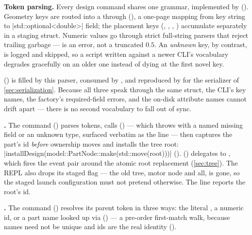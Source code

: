 \textbf{Token parsing.} Every design command shares one  grammar, implemented by
 (). Geometry keys are routed into a
 through  (), a one-page mapping from
key string to \cppinline|std::optional<double>| field; the placement keys (,
, , ) accumulate separately in a 
staging struct. Numeric values go through strict full-string parsers that reject trailing garbage
---  is an error, not a truncated $0.5$. An \emph{unknown} key, by contrast, is
logged and skipped, so a script written against a newer CLI's vocabulary degrades gracefully on an
older one instead of dying at the first novel key.

\begin{designrule}
 () is filled by this parser, consumed by
, and reproduced by  for the serializer of \cref{sec:serialization}.
Because all three speak through the same struct, the CLI's key names, the factory's required-field
errors, and the on-disk attribute names cannot drift apart --- there is no second vocabulary to
fall out of sync.
\end{designrule}

\textbf{.} The command () parses tokens, calls
 () --- which throws with a
named missing field or an unknown type, surfaced verbatim as the  line --- then captures
the part's id \emph{before} ownership moves and installs the tree root:
\cppinline|installDesign(model::PartNode::make(std::move(root)))|
().  ()
delegates to , which fires the  event pair around the
atomic root replacement (\cref{sec:tree}). The REPL also drops its staged  flag ---
the old tree, motor node and all, is gone, so the staged launch configuration must not pretend
otherwise. The  line reports the root's id.

\textbf{.} The command () resolves its parent token in three
ways: the literal , a numeric id, or a part name looked up via
 () --- a pre-order first-match walk,
because names need not be unique and ids are the real identity
().

